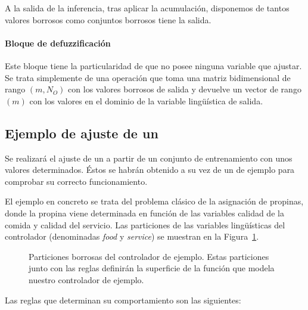 A la salida de la inferencia, tras aplicar la acumulación, disponemos de tantos valores borrosos como conjuntos borrosos tiene la salida.

\paragraph{Bloque de defuzzificación}

Este bloque tiene la particularidad de que no posee ninguna variable que ajustar. Se trata simplemente de una operación que toma una matriz bidimensional de rango $(m, N_O)$ con los valores borrosos de salida y devuelve un vector de rango $(m)$ con los valores en el dominio de la variable lingüística de salida.

\subsection{Ejemplo de ajuste de un }

Se realizará el ajuste de un  a partir de un conjunto de entrenamiento con unos valores determinados. Éstos se habrán obtenido a su vez de un  de ejemplo para comprobar su correcto funcionamiento.

El ejemplo en concreto se trata del problema clásico de la asignación de propinas, donde la propina viene determinada en función de las variables calidad de la comida y calidad del servicio. Las particiones de las variables lingüísticas del controlador (denominadas \textit{food} y \textit{service}) se muestran en la Figura~\ref{fig:real-tip-controller-vars}.

\begin{figure}
	\centering
	\qquad
	\caption[Particiones borrosas del controlador de ejemplo]{Particiones borrosas del controlador de ejemplo. Estas particiones junto con las reglas definirán la superficie de la función que modela nuestro controlador de ejemplo.}
	\label{fig:real-tip-controller-vars}
\end{figure}

Las reglas que determinan su comportamiento son las siguientes:

